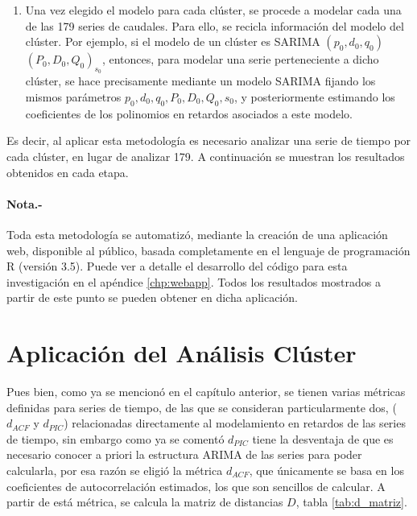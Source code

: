 \documentclass[12pt,oneside]{book}\usepackage[]{graphicx}\usepackage[]{color}
\theoremstyle{definition} %
\begin{document}
\begin{enumerate}
\begin{enumerate}
\end{enumerate}
\item Una vez elegido el modelo para cada clúster, se procede a modelar cada una de las 179 series de caudales. Para ello, se recicla información del modelo del clúster. Por ejemplo, si el modelo de un clúster	es SARIMA $(p_0,d_0,q_0)$ $(P_0,D_0,Q_0)_s_0$, entonces, para modelar una serie perteneciente a dicho clúster, se hace precisamente mediante un modelo SARIMA fijando los mismos parámetros $p_0, d_0, q_0, P_0, D_0, Q_0, s_0$, y posteriormente estimando los coeficientes de los polinomios en retardos asociados a este modelo. 

\end{enumerate}

Es decir, al aplicar esta metodología es necesario analizar una serie de tiempo por cada clúster, en lugar de analizar 179. A continuación se muestran los resultados obtenidos en cada etapa.

\paragraph{Nota.-} Toda esta metodología se automatizó, mediante la creación de una aplicación web, disponible al público, basada completamente en el lenguaje de programación R (versión 3.5). Puede ver a detalle el desarrollo del código para esta investigación en el apéndice \ref{chp:webapp}. Todos los resultados mostrados a partir de este punto se pueden obtener en dicha aplicación.



\section{Aplicación del Análisis Clúster}


Pues bien, como ya se mencionó en el capítulo anterior, se tienen varias métricas definidas para series de tiempo, de las que se consideran particularmente dos, ($d_{ACF}$ y $d_{PIC}$) relacionadas directamente al modelamiento en retardos de las series de tiempo, sin embargo como ya se comentó $d_{PIC}$ tiene la desventaja de que es necesario conocer a priori la estructura ARIMA de las series para poder calcularla, por esa razón se eligió la métrica $d_{ACF}$, que únicamente se basa en los coeficientes de autocorrelación estimados, los que son sencillos de calcular. A partir de está métrica, se calcula la matriz de distancias $D$, tabla \ref{tab:d_matriz}.
\end{document}
